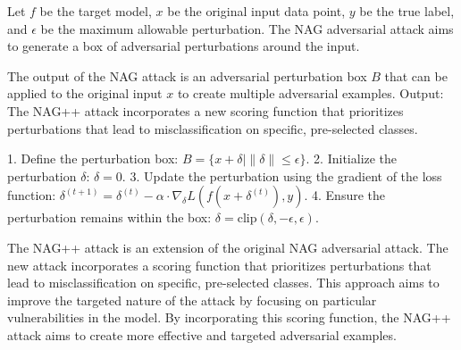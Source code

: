 Let \( f \) be the target model, \( x \) be the original input data point, \( y \) be the true label, and \( \epsilon \) be the maximum allowable perturbation. The NAG adversarial attack aims to generate a box of adversarial perturbations around the input.

The output of the NAG attack is an adversarial perturbation box \( B \) that can be applied to the original input \( x \) to create multiple adversarial examples.
Output: The NAG++ attack incorporates a new scoring function that prioritizes perturbations that lead to misclassification on specific, pre-selected classes.

1. Define the perturbation box:
   $
   B = \{ x + \delta \mid \|\delta\| \leq \epsilon \}.
   $
2. Initialize the perturbation \( \delta \):
   $
   \delta = 0.
   $
3. Update the perturbation using the gradient of the loss function:
   $
   \delta^{(t+1)} = \delta^{(t)} - \alpha \cdot \nabla_{\delta} L(f(x + \delta^{(t)}), y).
   $
4. Ensure the perturbation remains within the box:
   $
   \delta = \text{clip}(\delta, -\epsilon, \epsilon).
   $

The NAG++ attack is an extension of the original NAG adversarial attack. The new attack incorporates a scoring function that prioritizes perturbations that lead to misclassification on specific, pre-selected classes. This approach aims to improve the targeted nature of the attack by focusing on particular vulnerabilities in the model. By incorporating this scoring function, the NAG++ attack aims to create more effective and targeted adversarial examples.